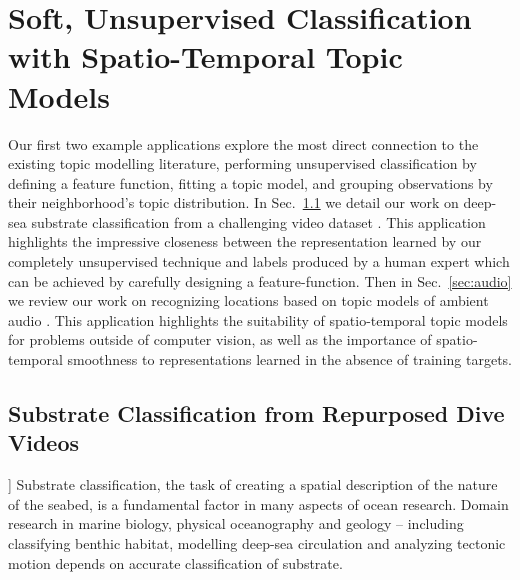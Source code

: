 
\chapter{Soft, Unsupervised Classification with Spatio-Temporal Topic Models} \label{ch:topic-models-examples}
Our first two example applications explore the most direct connection to the existing topic modelling literature, performing unsupervised classification by defining a feature function, fitting a topic model, and grouping observations by their neighborhood's topic distribution. In Sec.~\ref{sec:substrate} we detail our work on deep-sea substrate classification from a challenging video dataset \citep{Kalmbach2016}. This application highlights the impressive closeness between the representation learned by our completely unsupervised technique and labels produced by a human expert which can be achieved by carefully designing a feature-function. Then in Sec.~\ref{sec:audio} we review our work on recognizing locations based on topic models of ambient audio \citep{Kalmbach2013}. This application highlights the suitability of spatio-temporal topic models for problems outside of computer vision, as well as the importance of spatio-temporal smoothness to representations learned in the absence of training targets.

\section{Substrate Classification from Repurposed Dive Videos} \label{sec:substrate}

]
Substrate classification, the task of creating a spatial description of the nature of the seabed, is a fundamental factor in many aspects of ocean research.
Domain research in marine biology, physical oceanography and geology -- including classifying benthic  habitat, modelling deep-sea circulation and analyzing tectonic motion depends on accurate classification of substrate.

